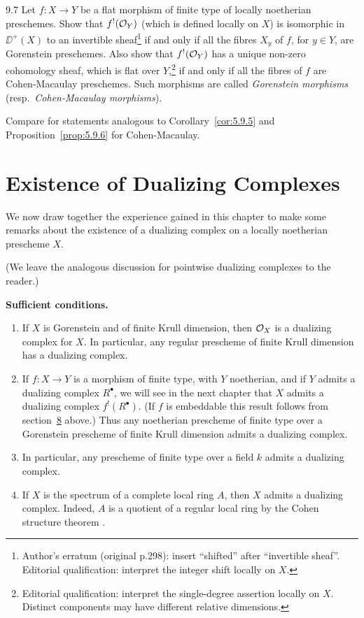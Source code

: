 \begin{bookexercise}{9.7}\label{rem:5.9.7}
Let $f\colon X\to Y$ be a flat morphism of finite type of locally noetherian preschemes. Show that $f^{!}(\mathcal{O}_Y)$ (which is defined locally on $X$) is isomorphic in $\DD^+(X)$ to an invertible sheaf\footnote{Author's erratum (original p.298): insert ``shifted'' after ``invertible sheaf''. Editorial qualification: interpret the integer shift locally on $X$.} if and only if all the fibres $X_y$ of $f$, for $y\in Y$, are Gorenstein preschemes. Also show that $f^{!}(\mathcal{O}_Y)$ has a unique non-zero cohomology sheaf, which is flat over $Y$,\footnote{Editorial qualification: interpret the single-degree assertion locally on $X$. Distinct components may have different relative dimensions.} if and only if all the fibres of $f$ are Cohen-Macaulay preschemes. Such morphisms are called \emph{Gorenstein morphisms} (resp.\ \emph{Cohen-Macaulay morphisms}).

Compare \cite[\nopp IV,~6.3 and 6.7]{EGA} for statements analogous to Corollary~\ref{cor:5.9.5} and Proposition~\ref{prop:5.9.6} for Cohen-Macaulay.
\end{bookexercise}

\par\endgroup

\section{Existence of Dualizing Complexes}\label{sec:5.10}

We now draw together the experience gained in this chapter to make some remarks about the existence of a dualizing complex on a locally noetherian prescheme $X$.

(We leave the analogous discussion for pointwise dualizing complexes to the reader.)

\medskip\noindent\textbf{Sufficient conditions.}
\begin{enumerate}
\item If $X$ is Gorenstein and of finite Krull dimension, then $\mathcal{O}_X$ is a dualizing complex for $X$. In particular, any regular prescheme of finite Krull dimension has a dualizing complex.
\item If $f\colon X\to Y$ is a morphism of finite type, with $Y$ noetherian, and if $Y$ admits a dualizing complex $R^\bullet$, we will see in the next chapter that $X$ admits a dualizing complex $f^{!}(R^\bullet)$. (If $f$ is embeddable this result follows from section~\hyperref[sec:5.8]{8} above.) Thus any noetherian prescheme of finite type over a Gorenstein prescheme of finite Krull dimension admits a dualizing complex.
\item In particular, any prescheme of finite type over a field $k$ admits a dualizing complex.
\item If $X$ is the spectrum of a complete local ring $A$, then $X$ admits a dualizing complex. Indeed, $A$ is a quotient of a regular local ring by the Cohen structure theorem \cite[\nopp (31.1)]{14}.
\end{enumerate}

